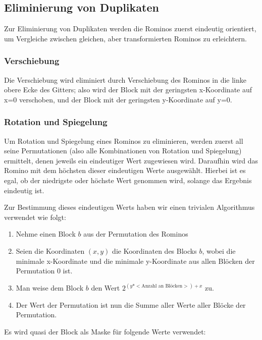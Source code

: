 \documentclass[a4paper,10pt,ngerman]{scrartcl}
\begin{document}
\subsection{Eliminierung von Duplikaten} \label{dupl}

Zur Eliminierung von Duplikaten werden die Rominos zuerst eindeutig orientiert, um Vergleiche zwischen gleichen, aber transformierten Rominos zu erleichtern.

\subsubsection{Verschiebung}

Die Verschiebung wird eliminiert durch Verschiebung des Rominos in die linke obere Ecke des Gitters; also wird der Block mit der geringsten x-Koordinate auf x=0 verschoben, und der Block mit der geringsten y-Koordinate auf y=0.

\subsubsection{Rotation und Spiegelung} \label{uniqueCode}

Um Rotation und Spiegelung eines Rominos zu eliminieren,
werden zuerst all seine Permutationen
(also alle Kombinationen von Rotation und Spiegelung)
ermittelt, denen jeweils ein eindeutiger Wert zugewiesen wird.
Daraufhin wird das Romino mit dem höchsten dieser eindeutigen Werte ausgewählt.
Hierbei ist es egal, ob der niedrigste oder höchste Wert genommen
wird, solange das Ergebnis eindeutig ist.

Zur Bestimmung dieses eindeutigen Werts haben wir einen trivialen Algorithmus
verwendet wie folgt:

\begin{enumerate}
\item Nehme einen Block \(b\) aus der Permutation des Rominos
\item Seien die Koordinaten \((x, y)\) die Koordinaten des Blocks \(b\), wobei die minimale x-Koordinate und die minimale y-Koordinate aus allen Blöcken der Permutation 0 ist.
\item Man weise dem Block \(b\) den Wert \(2^{(y * <\text{Anzahl an Blöcken}>) + x}\) zu.
\item Der Wert der Permutation ist nun die Summe aller Werte aller Blöcke der Permutation.
\end{enumerate}


Es wird quasi der Block als Maske für folgende Werte verwendet:
\end{document}
